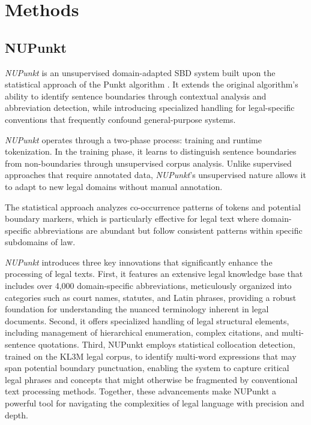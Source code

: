 \section{Methods}
 
\subsection{NUPunkt}
\textit{NUPunkt} is an unsupervised domain-adapted SBD system built upon the statistical approach of the Punkt algorithm \cite{kiss2006unsupervised}. It extends the original algorithm's ability to identify sentence boundaries through contextual analysis and abbreviation detection, while introducing specialized handling for legal-specific conventions that frequently confound general-purpose systems.

\textit{NUPunkt} operates through a two-phase process: training and runtime tokenization. In the training phase, it learns to distinguish sentence boundaries from non-boundaries through unsupervised corpus analysis. Unlike supervised approaches that require annotated data, \textit{NUPunkt}'s unsupervised nature allows it to adapt to new legal domains without manual annotation.

The statistical approach analyzes co-occurrence patterns of tokens and potential boundary markers, which is particularly effective for legal text where domain-specific abbreviations are abundant but follow consistent patterns within specific subdomains of law.

\textit{NUPunkt}  introduces three key innovations that significantly enhance the processing of legal texts.  First, it features an extensive legal knowledge base that includes over 4,000 domain-specific abbreviations, meticulously organized into categories such as court names, statutes, and Latin phrases, providing a robust foundation for understanding the nuanced terminology inherent in legal documents.  Second, it offers specialized handling of legal structural elements, including management of hierarchical enumeration, complex citations, and multi-sentence quotations.  Third, NUPunkt employs statistical collocation detection, trained on the KL3M legal corpus, to identify multi-word expressions that may span potential boundary punctuation, enabling the system to capture critical legal phrases and concepts that might otherwise be fragmented by conventional text processing methods.  Together, these advancements make NUPunkt a powerful tool for navigating the complexities of legal language with precision and depth.

